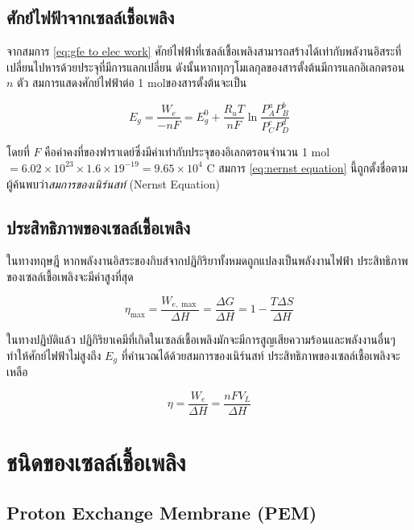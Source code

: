 \message{ !name(solar.tex)}\documentclass[
a4paper,
svgnames,
openany,
justified,
]{tufte-book}
\begin{document}
\subsection{ศักย์ไฟฟ้าจากเซลล์เชื้อเพลิง}

จากสมการ \ref{eq:gfe to elec work} ศักย์ไฟฟ้าที่เซลล์เชื้อเพลิงสามารถสร้างได้เท่ากับพลังานอิสระที่เปลี่ยนไปหารด้วยประจุที่มีการแลกเปลี่ยน ดังนั้นหากทุกๆโมเลกุลของสารตั้งต้นมีการแลกอิเลกตรอน $n$ ตัว สมการแสดงศักย์ไฟฟ้าต่อ 1 molของสารตั้งต้นจะเป็น

\begin{equation}
  \label{eq:nernst equation}
  E_g = \frac{W_e}{-nF} = E_g^0 + \frac{R_u T}{nF} \ln \frac{P_A^a P_B^b}{P_C^c P_D^d}
\end{equation}

โดยที่ $F$ คือค่าคงที่ของฟาราเดย์ซึ่งมีค่าเท่ากับประจุของอิเลกตรอนจำนวน 1 mol $= 6.02 \times 10^{23} \times 1.6 \times 19^{-19} = 9.65 \times 10^4 \text{ C}$ สมการ \ref{eq:nernst equation} นี้ถูกตั้งชื่อตามผู้ค้นพบว่า\emph{สมการของเนิร์นสท์} (Nernst Equation)

\subsection{ประสิทธิภาพของเซลล์เชื้อเพลิง}

ในทางทฤษฎี หากพลังงานอิสระของกิบส์จากปฏิกิริยาทั้งหมดถูกแปลงเป็นพลังงานไฟฟ้า ประสิทธิภาพของเซลล์เชื้อเพลิงจะมีค่าสูงที่สุด

\begin{equation}
  \label{eq:fc max eff}
  \eta_{\max} = \frac{W_{e,\max}}{\Delta H} = \frac{\Delta G}{\Delta H} = 1 - \frac{T \Delta S}{\Delta H}
\end{equation}

ในทางปฏิบัติแล้ว ปฏิกิริยาเคมีที่เกิดในเซลล์เชื้อเพลิงมักจะมีการสูญเสียความร้อนและพลังงานอื่นๆ ทำให้ศักย์ไฟฟ้าไม่สูงถึง $E_g$ ที่คำนวณได้ด้วยสมการของเนิร์นสท์ ประสิทธิภาพของเซลล์เชื้อเพลิงจะเหลือ

\begin{equation}
  \label{eq:fc act eff}
  \eta = \frac{W_e}{\Delta H} = \frac{nFV_L}{\Delta H}
\end{equation}

\section{ชนิดของเซลล์เชื้อเพลิง}

\subsection{Proton Exchange Membrane (PEM)}
\end{document}
